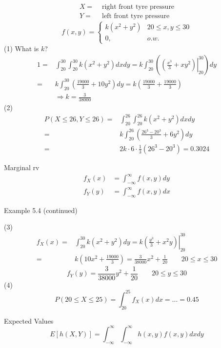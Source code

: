 \begin{exmp}
\begin{align*}
X=&\text{ right front tyre pressure}\\
Y=&\text{ left front tyre pressure}
\end{align*}
\[f(x,y)=\begin{cases}
k(x^2+y^2)   & 20\leq x,y \leq 30\\
0, 		& o.w.
\end{cases}\]
(1) What is $k$?
\begin{align*}
1=& \int_{20}^{30}\int_{20}^{30} k(x^2+y^2) dx dy = k\int_{20}^{30}  \left(\left.\left( \frac{x^3}{3}+xy^2 \right)\right|_{20}^{30} \right)dy \\
=& k \int_{20}^{30}  \left(\frac{19000}{3}+10y^2\right)dy=k\left(\frac{19000}{3}+\frac{19000}{3}\right) \\
&\Rightarrow k=\frac{3}{38000}
\end{align*}
(2)\begin{align*}
P(X\leq 26, Y\leq 26)=& \int_{20}^{26}\int_{20}^{26} k(x^2+y^2) dx dy\\
=&   k \int_{20}^{26}  \left(\frac{26^3-20^3}{3}+6y^2\right)dy\\
=&	2k\cdot 6 \cdot\frac{1}{3} (26^3-20^3)=0.3024
\end{align*}
\end{exmp}

\begin{defn}
Marginal rv
\begin{align*}
f_X(x)&=\int_{-\infty}^{\infty} f(x,y) dy	\\
f_Y(y)&=\int_{-\infty}^{\infty} f(x,y) dx	
\end{align*}
\end{defn}

\begin{exmp}
Example 5.4 (continued)

(3)
\begin{align*}
f_X(x)=& \int_{20}^{30} k(x^2+y^2) dy =k  \left. \left( \frac{y^3}{3}+x^2 y \right)\right|_{20}^{30}  \\
=& k\left(10x^2 +\frac{19000}{3}\right)=\frac{3}{38000}x^2+\frac{1}{20} \qquad 20 \leq x \leq 30
\end{align*}
\[f_Y(y)=\frac{3}{38000}y^2+\frac{1}{20} \qquad 20\leq y \leq 30\]
(4)
\[P(20 \leq X \leq 25)=\int_{20}^{25} f_X(x)dx=\dots=0.45\]

\end{exmp}

\begin{defn}
Expected Values
\[E[h(X,Y)]=\int_{-\infty}^{\infty} \int_{-\infty}^{\infty} h(x,y) f(x,y) dx dy \]
\end{defn}

